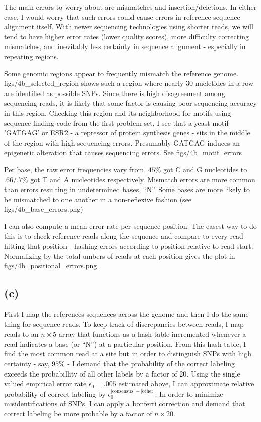 \documentclass[12pt,draft,a4paper]{article}
\begin{document}
The main errors to worry about are mismatches and insertion/deletions. In either case, I would worry that such errors could cause errors in reference sequence alignment itself. With newer sequencing technologies using shorter reads, we will tend to have higher error rates (lower quality scores), more difficulty correcting mismatches, and inevitably less certainty in sequence alignment - especially in repeating regions.

Some genomic regions appear to frequently mismatch the reference genome. figs/4b\_selected\_region shows such a region where nearly 30 nucletides in a row are identified as possible SNPs. Since there is high disagreement among sequencing reads, it is likely that some factor is causing poor sequencing accuracy in this region. Checking this region and its neighborhood for motifs using sequence finding code from the first problem set, I see that a yeast motif 'GATGAG' or ESR2 - a repressor of protein synthesis genes - sits in the middle of the region with high sequencing errors. Presumably GATGAG induces an epigenetic alteration that causes sequencing errors. See figs/4b\_motif\_errors
                                   
Per base, the raw error frequencies vary from $.45\%$ got C and G nucleotides to $.66/.7\%$ got T and A nucleotides respectively. Mismatch errors are more common than errors resulting in undetermined bases, ``N''. Some bases are more likely to be mismatched to one another in a non-reflexive fashion (see figs/4b\_base\_errors.png)

I can also compute a mean error rate per sequence position. The easest way to do this is to check reference reads along the sequence and compare to every read hitting that position - hashing errors according to position relative to read start. Normalizing by the total umbers of reads at each position gives the plot in figs/4b\_positional\_errors.png.



\pagebreak
\subsection*{(c)}
First I map the references sequences across the genome and then I do the same thing for sequence reads. To keep track of discrepancies between reads, I map reads to an $n\times5$ array that functions as a hash table incremented whenever a read indicates a base (or ``N'') at a particular position. From this hash table, I find the most common read at a site but in order to distinguish SNPs with high certainty - say, $95\%$ - I demand that the probability of the correct labeling exceeds the probabillity of all other labels by a factor of 20. Using the single valued empirical error rate $\epsilon_0 = .005$ estimated above, I can approximate relative probability of correct labeling by $\epsilon_0^{|\text{consensus}| - |\text{other}|}$. In order to minimize misidentifications of SNPs, I can apply a bonferri correction and demand that correct labeling be more probable by a factor of $n \times 20$.
\end{document}
